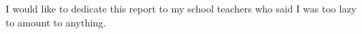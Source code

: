 
\begin{dedication} 

I would like to dedicate this report to my school teachers who said I was too lazy to amount to anything. 

\end{dedication}

